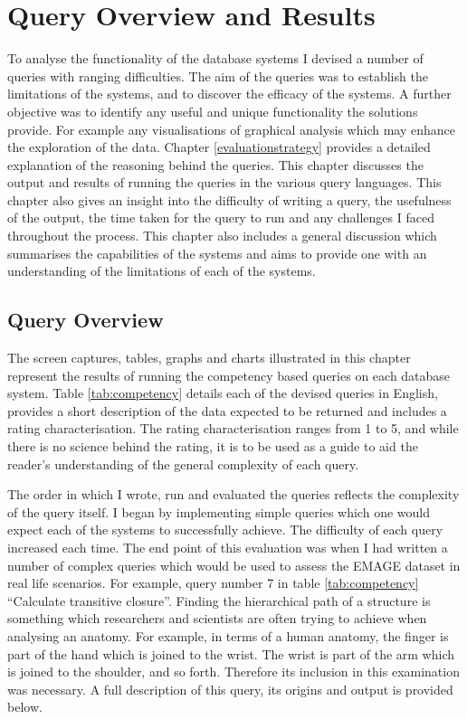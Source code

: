 \chapter{Query Overview and Results}\label{results}
To analyse the functionality of the database systems I devised a number of queries with ranging difficulties. The aim of the queries was to establish the limitations of the systems, and to discover the efficacy of the systems. A further objective was to identify any useful and unique functionality the solutions provide. For example any visualisations of graphical analysis which may enhance the exploration of the data. Chapter \ref{evaluationstrategy} provides a detailed explanation of the reasoning behind the queries. This chapter discusses the output and results of running the queries in the various query languages. This chapter also gives an insight into the difficulty of writing a query, the usefulness of the output, the time taken for the query to run and any challenges I faced throughout the process. This chapter also includes a general discussion which summarises the capabilities of the systems and aims to provide one with an understanding of the limitations of each of the systems.

\section{Query Overview}\label{output}
The screen captures, tables, graphs and charts illustrated in this chapter represent the results of running the competency based queries on each database system. Table \ref{tab:competency} details each of the devised queries in English, provides a short description of the data expected to be returned and includes a rating characterisation. The rating characterisation ranges from 1 to 5, and while there is no science behind the rating, it is to be used as a guide to aid the reader's understanding of the general complexity of each query.

The order in which I wrote, run and evaluated the queries reflects the complexity of the query itself. I began by implementing simple queries which one would expect each of the systems to successfully achieve. The difficulty of each query increased each time. The end point of this evaluation was when I had written a number of complex queries which would be used to assess the EMAGE dataset in real life scenarios. For example, query number 7 in table \ref{tab:competency} ``Calculate transitive closure''. Finding the hierarchical path of a structure is something which researchers and scientists are often trying to achieve when analysing an anatomy. For example, in terms of a human anatomy, the finger is part of the hand which is joined to the wrist. The wrist is part of the arm which is joined to the shoulder, and so forth. Therefore its inclusion in this examination was necessary. A full description of this query, its origins and output is provided below. 

